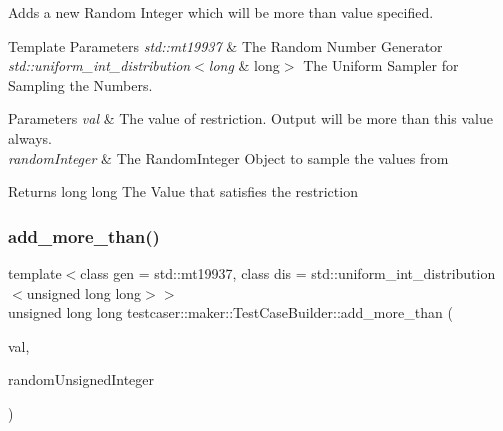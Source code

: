 Adds a new Random Integer which will be more than value specified. 


\begin{DoxyTemplParams}{Template Parameters}
{\em std\+::mt19937} & The Random Number Generator \\
\hline
{\em std\+::uniform\+\_\+int\+\_\+distribution$<$long} & long$>$ The Uniform Sampler for Sampling the Numbers. \\
\hline
\end{DoxyTemplParams}

\begin{DoxyParams}{Parameters}
{\em val} & The value of restriction. Output will be more than this value always. \\
\hline
{\em random\+Integer} & The Random\+Integer Object to sample the values from \\
\hline
\end{DoxyParams}
\begin{DoxyReturn}{Returns}
long long The Value that satisfies the restriction 
\end{DoxyReturn}
\mbox{\label{classtestcaser_1_1maker_1_1TestCaseBuilder_a00745e4a312209178432e06d4c9aae08}} 
\subsubsection{\texorpdfstring{add\_more\_than()}{add\_more\_than()}\hspace{0.1cm}{\footnotesize\ttfamily [2/2]}}
{\footnotesize\ttfamily template$<$class gen  = std\+::mt19937, class dis  = std\+::uniform\+\_\+int\+\_\+distribution$<$unsigned long long$>$$>$ \\
unsigned long long testcaser\+::maker\+::\+Test\+Case\+Builder\+::add\+\_\+more\+\_\+than (\begin{DoxyParamCaption}\item[{unsigned long long}]{val,  }\item[{\mbox{\hyperlink{classtestcaser_1_1maker_1_1types_1_1RandomUnsignedInteger}{types\+::\+Random\+Unsigned\+Integer}}$<$ gen, dis $>$ \&}]{random\+Unsigned\+Integer }\end{DoxyParamCaption})\hspace{0.3cm}{\ttfamily [inline]}}



